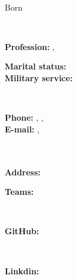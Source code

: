\documentclass{./../lib/curriculumVitae}
\begin{document}
\iftoggle{Dev}{\par}{}
\noindent\parbox{56mm}
{\parbox{56mm}{\centering\Huge\bfseries\color{cyan}\fullName}\\\parbox{56mm}{\centering Born \bornData}}\parbox{2mm}{\ }\parbox{132mm}
{\textbf{Profession:} \ProfessionI, \ProfessionII\\\parbox{40mm}
{\textbf{Marital status:} \maritalStatus\\\textbf{Military service:} \militaryService}\parbox{2mm}{\ }\parbox{90mm}
{\textbf{Phone:} \mobilePhoneI, \mobilePhoneII, \phoneNumber\\\textbf{E-mail:} \emailI, \emailII}}\\\\
\textbf{Address:} \fullAddress\\
\parbox{46mm}{\textbf{Teams:} \skype}\parbox{2mm}{\ }\parbox{66mm}{\textbf{GitHub:} \gitHub}\parbox{2mm}{\ }\parbox{74mm}{\textbf{Linkdin:} \linkedin}

\descriptions

\education

\workExperience

\teaching

\project

\publication

\LicensesCertifications

\honorsAwards

\training

\languageS

\craft

\voluntary
\end{document}
